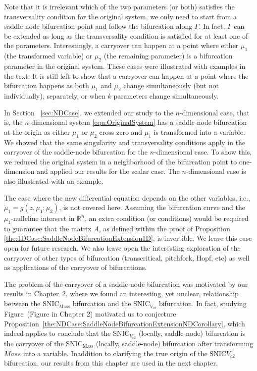 \documentclass[12pt]{article}
\begin{document}
Note that it is irrelevant which of the two parameters (or both) satisfies the transversality condition for the original system, we only need to start from a saddle-node bifurcation point and follow the bifurcation along $\Gamma$. In fact, $\Gamma$ can be extended as long as the transversality condition is satisfied for at least one of the parameters. Interestingly, a carryover can happen at a point where either $\mu_{1}$ (the transformed variable) or $\mu_{2}$ (the remaining parameter) is a bifurcation parameter in the original system. These cases were illustrated with examples in the text. It is still left to show that a carryover can happen at a point where the bifurcation happens as both $\mu_{1}$ and $\mu_{2}$ change simultaneously (but not individually), separately, or when $k$ parameters change simultaneously.

In Section ~\ref{sec:NDCase}, we extended our study to the $n$-dimensional case, that is, the $n$-dimensional system \eqref{equ:OriginalSystem} has a saddle-node bifurcation at the origin as either $\mu_{1}$ or $\mu_{2}$ cross zero and $\mu_{1}$ is transformed into a variable. We showed that the same singularity and transversality conditions apply in the carryover of the saddle-node bifurcation for the $n$-dimensional case. To show this, we reduced the original system in a neighborhood of the bifurcation point to one-dimension and applied our results for the scalar case. The $n$-dimensional case is also illustrated with an example.

The case where the new differential equation depends on the other variables, i.e., $\dot \mu_{1}=g(z,\mu_{1};\mu_{2})$, is not covered here. Assuming the bifurcation curve and the $\mu_{1}$-nullcline intersect in $\mathbb{R}^{n}$, an extra condition (or conditions) would be required to guarantee that the matrix $A$, as defined within the proof of Proposition \eqref{the:1DCase:SaddleNodeBifurcationExtension1D}, is invertible. We leave this case open for future research. We also leave open the interesting exploration of the carryover of other types of bifurcation (transcritical, pitchfork, Hopf, etc) as well as applications of the carryover of bifurcations.

The problem of the carryover of a saddle-node bifurcation was motivated by our results in Chapter~2, where we found an interesting, yet unclear, relationship between the SNIC$_{\text{Mass}}$ bifurcation and the SNIC$_{V_{c2}}$ bifurcation. In fact, studying Figure~(Figure in Chapter 2) motivated us to conjecture Proposition~\ref{the:NDCase:SaddleNodeBifurcationExtensionNDCorollary}, which indeed applies to conclude that the SNIC$_{V_{c2}}$ (locally, saddle-node) bifurcation is the carryover of the SNIC$_{\text{Mass}}$ (locally, saddle-node) bifurcation after transforming $Mass$ into a variable. Inaddition to clarifying the true origin of the SNIC$V_{c2}$ bifurcation, our results from this chapter are used in the next chapter.
\end{document}
